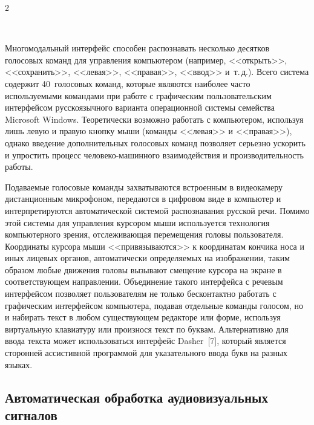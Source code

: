 \begin{multicols}{2}
\begin{figure} %
 \vspace*{1pt}
 \begin{center}
 \mbox{%
 \epsfxsize=161.784mm
 }
 \end{center}
 \vspace*{-9pt}
\end{figure}

  Многомодальный интерфейс способен распознавать несколько десятков 
голосовых команд для управления компьютером (например, <<открыть>>, 
<<сохранить>>, <<левая>>, <<правая>>, <<ввод>> и~т.\,д.). Всего система 
содержит 40~голосовых команд, которые являются наиболее часто 
используемыми командами при работе с графическим пользовательским 
интерфейсом русскоязычного варианта операционной системы семейства 
Microsoft Windows. Теоретически возможно работать с компьютером, 
используя лишь левую и правую кнопку мыши (команды <<левая>> и 
<<правая>>), однако введение дополнительных голосовых команд позволяет 
серьезно ускорить и упростить процесс человеко-машинного взаимодействия и 
производительность работы.
  
  Подаваемые голосовые команды захватываются встроенным в видеокамеру 
дистанционным микрофоном, передаются в цифровом виде в компьютер и 
интерпретируются автоматической системой распознавания русской речи. 
Помимо этой системы для управления курсором мыши используется 
технология компьютерного зрения, от\-сле\-жи\-ва\-ющая перемещения головы 
пользователя. Координаты курсора мыши <<привязываются>> к координатам 
кончика носа и иных лицевых органов, автоматически определяемых на 
изображении, таким образом любые движения головы вызывают смещение 
курсора на экране в соответствующем направлении. Объединение такого 
интерфейса с речевым интерфейсом позволяет пользователям не только 
бесконтактно работать с графическим интерфейсом компьютера, подавая 
отдельные команды голосом, но и набирать текст в любом существующем 
редакторе или форме, используя виртуальную клавиатуру или произнося текст 
по буквам. Альтернативно для ввода текста может использоваться интерфейс 
Dasher~[7], который является сторонней ассистивной программой для 
указательного ввода букв на разных языках.
  
\subsection{Автоматическая обработка аудиовизуальных сигналов}
  

\end{multicols}
